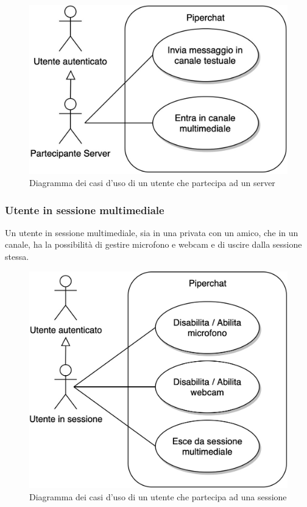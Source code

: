 \begin{figure}[H]
    \centering
    \includegraphics[width=0.6\linewidth]{sections/01-goal/img/use-cases/piperchat-Casi d'uso-5.jpg}
    \caption{Diagramma dei casi d'uso di un utente che partecipa ad un server}
\end{figure}

%
%
%
\subsubsection{Utente in sessione multimediale}

Un utente in sessione multimediale, sia in una privata con un amico, che in un canale, ha la possibilità di gestire microfono e webcam e di uscire dalla sessione stessa.

\begin{figure}[H]
    \centering
    \includegraphics[width=0.7\linewidth]{sections/01-goal/img/use-cases/piperchat-Casi d'uso-6.jpg}
    \caption{Diagramma dei casi d'uso di un utente che partecipa ad una sessione}
\end{figure}


